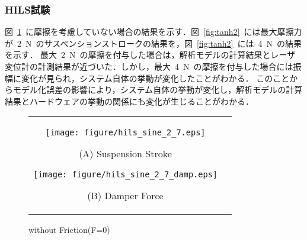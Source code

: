 \documentclass[a4paper,12pt]{article_vdlab_sotsuron}
\begin{document}
\subsubsection{HILS試験}
図~\ref{fig:tanh0}~に摩擦を考慮していない場合の結果を示す．図~\ref{fig:tanh2}~には最大摩擦力が~2~N~のサスペンションストロークの結果を，図~\ref{fig:tanh2}~には~4~N~の結果を示す．
最大~2~N~の摩擦を付与した場合は，解析モデルの計算結果とレーザ変位計の計測結果が近づいた．しかし，最大~4~N~の摩擦を付与した場合には振幅に変化が見られ，システム自体の挙動が変化したことがわかる．
このことからモデル化誤差の影響により，システム自体の挙動が変化し，解析モデルの計算結果とハードウェアの挙動の関係にも変化が生じることがわかる．
\vspace{2mm}
\begin{figure}[h]
    \begin{tabular}{cc}
      \begin{minipage}{0.45\hsize}
	\centering
	  \texttt{[image: figure/hils\_sine\_2\_7.eps]}
	  \begin{center}
	  \vspace{2mm}
	  \ (A) Suspension Stroke\
	  \end{center}
	\end{minipage}
       \begin{minipage}{0.5\hsize}
	\centering
	  \texttt{[image: figure/hils\_sine\_2\_7\_damp.eps]}
	  \begin{center}
	  \vspace{2mm}
	  \ (B) Damper Force\
	  \end{center}
      \end{minipage}
    \end{tabular}
    \vspace{2mm}
    \caption{without Friction(F=0)}
    \label{fig:tanh0}
\end{figure}
\end{document}
